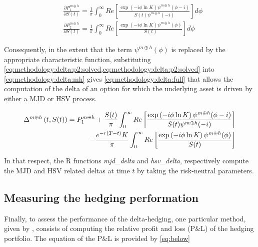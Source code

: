\documentclass[a4paper, 12pt]{report}
\begin{document}
\begin{align}
&\frac{\partial P_1^{m \oplus h}}{\partial S(t)} = 
  \frac{1}{\pi}
  \int_0^{\infty} Re \left[
    \frac{\exp\left( -i \phi \ln K \right) \psi^{m \oplus h}(\phi -i)}
      {S(t)\psi^{m \oplus h}(-i)}
  \right] d\phi \label{eq:methodology:delta:p1:solved} \\
&\frac{\partial P_2^{m \oplus h}}{\partial S(t)} =
\frac{1}{\pi}
  \int_0^{\infty} Re \left[
    \frac{\exp\left( -i \phi \ln K \right) \psi^{m \oplus h}(\phi)}
      {S(t)}
  \right]d\phi \label{eq:methodology:delta:p2:solved}
\end{align}

Consequently, in the extent that the term $\psi^{m \oplus h}(\phi)$ is replaced by the appropriate characteristic function, substituting \cref{eq:methodology:delta:p2:solved,eq:methodology:delta:p2:solved} into \ref{eq:methodology:delta:mh} gives \ref{eq:methodology:delta:full} that allows the computation of the delta of an option for which the underlying asset is driven by either a MJD or HSV process.


\begin{align}
  \Delta^{m \oplus h}\left(t, S(t)\right)  =
  P_1^{m \oplus h} + 
  \frac{S(t)}{\pi}
    \int_0^{\infty} Re \left[
    \frac{\exp\left( -i \phi \ln K \right) \psi^{m \oplus h}(\phi -i)}
      {S(t)\psi^{m \oplus h}(-i)}
  \right] \notag\\
    \mspace{150mu}
  - \frac{e^{-r(T-t)} K}{\pi}
    \int_0^{\infty} Re \left[
    \frac{\exp\left( -i \phi \ln K \right) \psi^{m \oplus h}(\phi)}
      {S(t)}
  \right]
\label{eq:methodology:delta:full}
\end{align}

In that respect, the R functions \textit{mjd\_delta} and \textit{hsv\_delta}, respectively compute the MJD and HSV related deltas at time $t$ by taking the risk-neutral parameters.




\subsection{Measuring the hedging performation}
\label{sec:methodology:measuring}

Finally, to assess the performance of the delta-hedging, one particular method, given by \citet{he2006calibration}, consists of computing the relative profit and loss (P\&L) of the hedging portfolio.
The equation of the P\&L is provided by \ref{eq:below}
\end{document}
